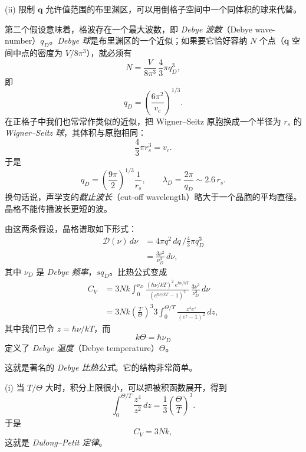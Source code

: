 (ii) 限制 $\mathbf{q}$ 允许值范围的布里渊区，可以用倒格子空间中一个同体积的球来代替。

第二个假设意味着，格波存在一个最大波数，即 \emph{Debye 波数}（Debye wave-number）$q_D$。\emph{Debye 球}是布里渊区的一个近似；如果要它恰好容纳 $N$ 个点（$\mathbf{q}$ 空间中点的密度为 $V/8\pi^3$），就必须有
\begin{equation*}
N = \frac{V}{8\pi^3}\,\frac{4}{3}\pi q_D^3,
\tag{2.52}
\end{equation*}
即
\begin{equation*}
q_D = \left(\frac{6\pi^2}{v_c}\right)^{1/3}.
\tag{2.53}
\end{equation*}
在正格子中我们也常常作类似的近似，把 Wigner–Seitz 原胞换成一个半径为 $r_s$ 的 \emph{Wigner–Seitz 球}，其体积与原胞相同：
\begin{equation*}
\frac{4}{3}\pi r_s^3 = v_c.
\tag{2.54}
\end{equation*}
于是
\begin{equation*}
q_D = \left(\frac{9\pi}{2}\right)^{1/3}\frac{1}{r_s}, \qquad \lambda_D = \frac{2\pi}{q_D} \sim 2.6\, r_s.
\tag{2.55}
\end{equation*}
换句话说，声学支的\emph{截止波长}（cut-off wavelength）略大于一个晶胞的平均直径。晶格不能传播波长更短的波。

由这两条假设，晶格谱取如下形式：
\begin{align*}
\mathcal{D}(\nu)\, d\nu &= 4\pi q^2\, dq \,\Big/ \frac{4}{3}\pi q_D^3 \\
&= \frac{3\nu^2}{\nu_D^3}\, d\nu,
\tag{2.56}
\end{align*}
其中 $\nu_D$ 是 \emph{Debye 频率}，$sq_D$。比热公式变成
\begin{align*}
C_V &= 3Nk \int_0^{\nu_D} \frac{(\hbar\nu/kT)^2\, e^{\hbar\nu/kT}}{(e^{\hbar\nu/kT}-1)^2}\,\frac{3\nu^2}{\nu_D^3}\, d\nu \\
&= 3Nk\left(\frac{T}{\Theta}\right)^3 3\int_0^{\Theta/T} \frac{z^4 e^z}{(e^z-1)^2}\, dz,
\tag{2.57}
\end{align*}
其中我们已令 $z=\hbar\nu/kT$，而
\begin{equation*}
k\Theta = \hbar\nu_D
\tag{2.58}
\end{equation*}
定义了 \emph{Debye 温度}（Debye temperature）$\Theta$。


这就是著名的 \emph{Debye 比热公式}。它的结构非常简单。

(i) 当 $T/\Theta$ 大时，积分上限很小，可以把被积函数展开，得到
\begin{equation*}
\int_0^{\Theta/T} \frac{z^4}{z^2}\, dz = \frac{1}{3}\left(\frac{\Theta}{T}\right)^3.
\tag{2.59}
\end{equation*}
于是
\begin{equation*}
C_V = 3Nk,
\tag{2.60}
\end{equation*}
这就是 \emph{Dulong–Petit 定律}。

